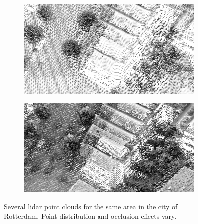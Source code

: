 \begin{figure}
	\begin{subfigure}{0.45\linewidth}
		\includegraphics[width=\textwidth]{figs/ahn3_d.png}
		\label{fig:pcd:ahn3}
	\end{subfigure}
	\quad
	\begin{subfigure}{0.45\linewidth}
		\includegraphics[width=\textwidth]{figs/rdam16_d.png}
		\label{fig:pcd:rdam16}
	\end{subfigure}
	\caption{Several lidar point clouds for the same area in the city of Rotterdam. Point distribution and occlusion effects vary.}
  \label{fig:pcd}
\end{figure}

